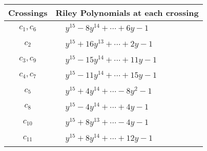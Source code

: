 \documentclass[1p]{elsarticle_modified}
\theoremstyle{definition}
\begin{document}
\begin{tabular}{m{50pt}|m{274pt}}
Crossings & \hspace{64pt}Riley Polynomials at each crossing \\
\hline $$\begin{aligned}c_{1},c_{6}\end{aligned}$$&$\begin{aligned}
&y^{15}-8 y^{14}+\cdots+6 y-1
\end{aligned}$\\
\hline $$\begin{aligned}c_{2}\end{aligned}$$&$\begin{aligned}
&y^{15}+16 y^{13}+\cdots+2 y-1
\end{aligned}$\\
\hline $$\begin{aligned}c_{3},c_{9}\end{aligned}$$&$\begin{aligned}
&y^{15}-15 y^{14}+\cdots+11 y-1
\end{aligned}$\\
\hline $$\begin{aligned}c_{4},c_{7}\end{aligned}$$&$\begin{aligned}
&y^{15}-11 y^{14}+\cdots+15 y-1
\end{aligned}$\\
\hline $$\begin{aligned}c_{5}\end{aligned}$$&$\begin{aligned}
&y^{15}+4 y^{14}+\cdots-8 y^2-1
\end{aligned}$\\
\hline $$\begin{aligned}c_{8}\end{aligned}$$&$\begin{aligned}
&y^{15}-4 y^{14}+\cdots+4 y-1
\end{aligned}$\\
\hline $$\begin{aligned}c_{10}\end{aligned}$$&$\begin{aligned}
&y^{15}+8 y^{13}+\cdots-4 y-1
\end{aligned}$\\
\hline $$\begin{aligned}c_{11}\end{aligned}$$&$\begin{aligned}
&y^{15}+8 y^{14}+\cdots+12 y-1
\end{aligned}$\\
\hline
\end{tabular}\\~\\
\end{document}
